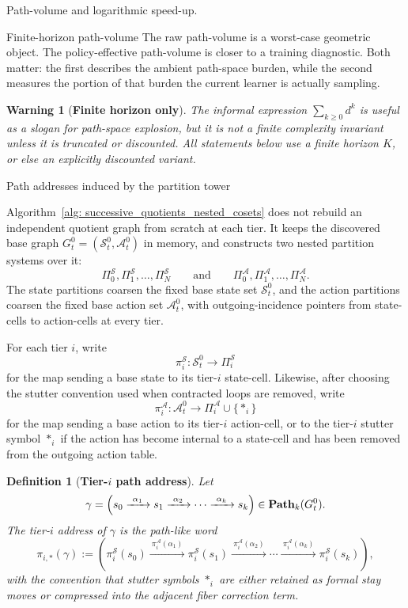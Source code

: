 \documentclass[11pt]{article}
\newtheorem{definition}[subsubsection]{Definition}
\newtheorem{warning}[subsubsection]{Warning}
\begin{document}
\begin{section}{Path-volume and logarithmic speed-up.}
\begin{subsection}{Finite-horizon path-volume}
The raw path-volume is a worst-case geometric object. The policy-effective path-volume is closer to a training diagnostic. Both matter: the first describes the ambient path-space burden, while the second measures the portion of that burden the current learner is actually sampling.

\begin{warning}[{\bf Finite horizon only}]
\normalfont
The informal expression
$
\sum_{k\ge0}d^k
$
is useful as a slogan for path-space explosion, but it is not a finite complexity invariant unless it is truncated or discounted. All statements below use a finite horizon $K$, or else an explicitly discounted variant.
\end{warning}

\end{subsection}

\begin{subsection}{Path addresses induced by the partition tower}

Algorithm~\ref{alg: successive_quotients_nested_cosets} does not rebuild an independent quotient graph from scratch at each tier. It keeps the discovered base graph
$
G_t^0=(\mathcal{S}_t^0,\mathcal{A}_t^0)
$
in memory, and constructs two nested partition systems over it:
$$
\Pi_0^{\mathcal S},\Pi_1^{\mathcal S},\ldots,\Pi_N^{\mathcal S}
\qquad\text{and}\qquad
\Pi_0^{\mathcal A},\Pi_1^{\mathcal A},\ldots,\Pi_N^{\mathcal A}.
$$
The state partitions coarsen the fixed base state set $\mathcal{S}_t^0$, and the action partitions coarsen the fixed base action set $\mathcal{A}_t^0$, with outgoing-incidence pointers from state-cells to action-cells at every tier.

For each tier $i$, write
$$
\pi_i^{\mathcal S}:\mathcal{S}_t^0\longrightarrow\Pi_i^{\mathcal S}
$$
for the map sending a base state to its tier-$i$ state-cell. Likewise, after choosing the stutter convention used when contracted loops are removed, write
$$
\pi_i^{\mathcal A}:\mathcal{A}_t^0\longrightarrow\Pi_i^{\mathcal A}\cup\{\ast_i\}
$$
for the map sending a base action to its tier-$i$ action-cell, or to the tier-$i$ stutter symbol $\ast_i$ if the action has become internal to a state-cell and has been removed from the outgoing action table.

\begin{definition}[{\bf Tier-$i$ path address}]\label{def:tier-i-path-address}
\normalfont
Let
$$
\gamma
=
\left(
s_0\xrightarrow{\ \alpha_1\ }s_1
\xrightarrow{\ \alpha_2\ }\cdots
\xrightarrow{\ \alpha_k\ }s_k
\right)
\in \bold{Path}_k(G_t^0).
$$
The tier-$i$ address of $\gamma$ is the path-like word
$$
\pi_{i,*}(\gamma)
:=
\left(
\pi_i^{\mathcal S}(s_0)
\xrightarrow{\ \pi_i^{\mathcal A}(\alpha_1)\ }
\pi_i^{\mathcal S}(s_1)
\xrightarrow{\ \pi_i^{\mathcal A}(\alpha_2)\ }
\cdots
\xrightarrow{\ \pi_i^{\mathcal A}(\alpha_k)\ }
\pi_i^{\mathcal S}(s_k)
\right),
$$
with the convention that stutter symbols $\ast_i$ are either retained as formal stay moves or compressed into the adjacent fiber correction term.
\end{definition}


\end{subsection}
\end{section}
\end{document}
